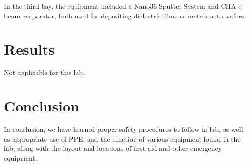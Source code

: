 \documentclass[12pt]{article}
\begin{document}
In the third bay, the equipment included a Nano36 Sputter System and CHA e-beam evaporator, both used for depositing dielectric films or metals onto wafers. 

\section{Results}

Not applicable for this lab.

\section{Conclusion}

In conclusion, we have learned proper safety procedures to follow in lab, as well as appropriate use of PPE, and the function of various equipment found in the lab, along with the layout and locations of first aid and other emergency equipment.
\end{document}

